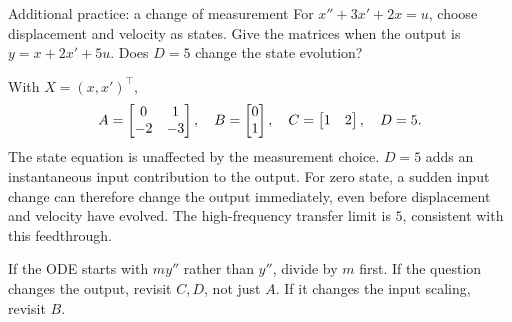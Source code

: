 \begin{question}{Additional practice: a change of measurement}
For $x''+3x'+2x=u$, choose displacement and velocity as states. Give the matrices when the output is $y=x+2x'+5u$. Does $D=5$ change the state evolution?
\end{question}
\begin{answer}
With $X=(x,x')^{\top}$,
\[A=\begin{bmatrix}0&1\\-2&-3\end{bmatrix},\quad B=\begin{bmatrix}0\\1\end{bmatrix},\quad C=\begin{bmatrix}1&2\end{bmatrix},\quad D=5.\]
The state equation is unaffected by the measurement choice. $D=5$ adds an instantaneous input contribution to the output. For zero state, a sudden input change can therefore change the output immediately, even before displacement and velocity have evolved. The high-frequency transfer limit is $5$, consistent with this feedthrough.
\end{answer}
\begin{tip}
If the ODE starts with $my''$ rather than $y''$, divide by $m$ first. If the question changes the output, revisit $C,D$, not just $A$. If it changes the input scaling, revisit $B$.
\end{tip}

